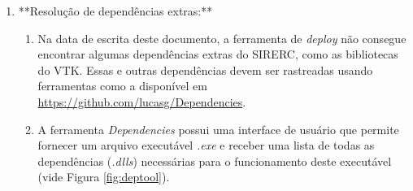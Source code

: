 \documentclass[a4paper,11pt]{article}
\newcommand{\sistema}{\textsf{SIRERC}}
\newcommand{\msvc}{\textit{MSVC}}
\begin{document}
\begin{enumerate}
\begin{enumerate}
		\begin{verbatim}
			${QtDirectory}\5.15.2\msvc2015_64\bin\windeployqt.exe Sirerc_Project.exe --compiler-runtime
		\end{verbatim}
		
		\item Aguarde a conclusão do processo de \emph{deploy} e verifique se há uma grande quantidade de novos arquivos e diretórios dentro do diretório  (vide Figura \ref{fig:sirercdeploy}).
		
		\begin{figure}[H]\centering
			\caption{Diretório \emph{win64} após o \emph{deploy}}\label{fig:sirercdeploy}
		\end{figure}
	\end{enumerate}
	
	\item **Resolução de dependências extras:**
	\begin{enumerate}
		\item Na data de escrita deste documento, a ferramenta de \emph{deploy} não consegue encontrar algumas dependências extras do \sistema{}, como as bibliotecas do VTK. Essas e outras dependências devem ser rastreadas usando ferramentas como a disponível em \url{https://github.com/lucasg/Dependencies}.
		\item A ferramenta \emph{Dependencies} possui uma interface de usuário que permite fornecer um arquivo executável \emph{.exe} e receber uma lista de todas as dependências (\emph{.dlls}) necessárias para o funcionamento deste executável (vide Figura \ref{fig:deptool}).
		

\end{enumerate}
\end{enumerate}
\end{document}
